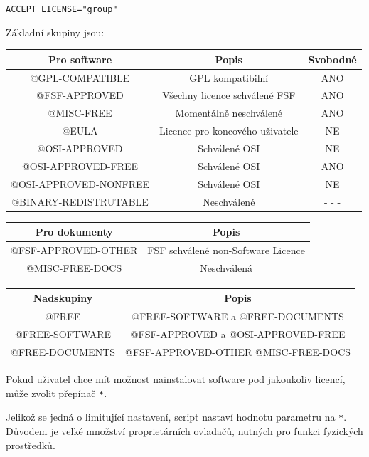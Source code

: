 \documentclass[12pt,a4paper,twoside,]{article}
\begin{document}
{\texttt{ACCEPT\_LICENSE="group"}

Základní skupiny jsou:

\begin{table}[h]
	\centering
	\begin{tabular}{|c|c|c|}
		\hline
		Pro software & Popis & Svobodné \\
		\hline
		@GPL-COMPATIBLE & GPL kompatibilní & ANO \\
		\hline
		@FSF-APPROVED & Všechny licence schválené FSF & ANO \\
		\hline
		@MISC-FREE & Momentálně neschválené & ANO \\
		\hline		
		@EULA & Licence pro koncového uživatele & NE \\
		\hline
		@OSI-APPROVED & Schválené OSI & NE \\
		\hline
		@OSI-APPROVED-FREE & Schválené OSI & ANO \\
		\hline
		@OSI-APPROVED-NONFREE & Schválené OSI & NE \\
		\hline
		@BINARY-REDISTRUTABLE & Neschválené & - - - \\
		\hline

	\end{tabular}
\end{table}
\begin{table}[h]
	\centering
	\begin{tabular}{|c|c|}
		\hline
		Pro dokumenty & Popis \\
		\hline
		@FSF-APPROVED-OTHER & FSF schválené non-Software Licence \\
		\hline
		@MISC-FREE-DOCS & Neschválená \\
		\hline
	\end{tabular}
\end{table}
\begin{table}[h]
	\centering
	\begin{tabular}{|c|c|}
	\hline
	Nadskupiny & Popis \\
	\hline
	@FREE & @FREE-SOFTWARE a @FREE-DOCUMENTS \\
	\hline
	@FREE-SOFTWARE & @FSF-APPROVED a @OSI-APPROVED-FREE\\
	\hline
	@FREE-DOCUMENTS & @FSF-APPROVED-OTHER @MISC-FREE-DOCS\\
	\hline
	\end{tabular}
\end{table}
Pokud uživatel chce mít možnost nainstalovat software pod jakoukoliv licencí, může zvolit přepínač \texttt{*}.

Jelikož se jedná o limitující nastavení, script nastaví hodnotu parametru na \texttt{*}. Důvodem je velké množství proprietárních ovladačů, nutných pro funkci fyzických prostředků.


}
\end{document}
